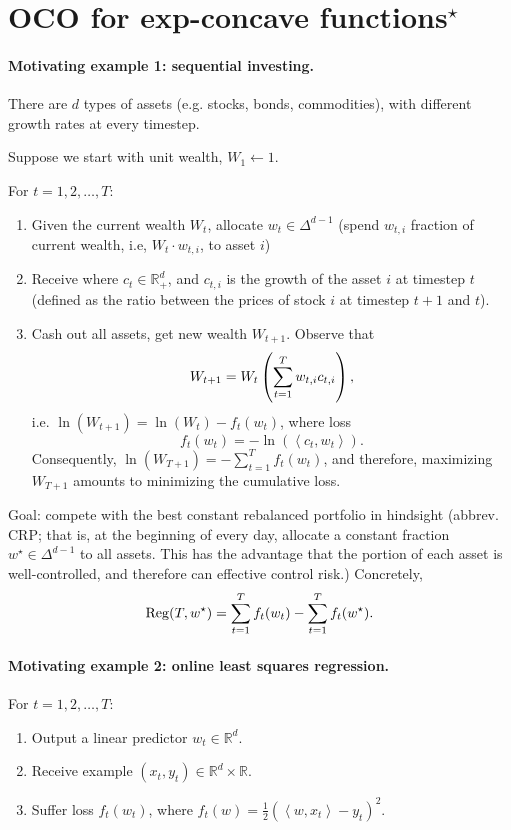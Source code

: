 \documentclass{article}
\DeclareMathOperator*{\Reg}{{\rm Reg}}
\newcommand{\RR}{\mathbb{R}} %
\newcommand{\inner}[2]{\left\langle #1,#2 \right\rangle}
\begin{document}

\section{OCO for exp-concave functions$^\star$}

\paragraph{Motivating example 1: sequential investing.} There are $d$ types of assets (e.g. stocks, bonds, commodities), with different growth rates at every timestep.

Suppose we start with unit wealth, $W_1 \gets 1$.

For $t = 1,2,\ldots,T$:
\begin{enumerate}
\item Given the current wealth $W_t$, allocate $w_t \in \Delta^{d-1}$ (spend $w_{t,i}$ fraction of current wealth, i.e, $W_t \cdot w_{t,i}$, to asset $i$)
\item Receive where $c_t \in \RR^d_+$, and $c_{t,i}$ is the growth of the asset $i$ at timestep $t$ (defined as the ratio between the prices of stock $i$ at timestep $t+1$ and $t$).
\item Cash out all assets, get new wealth $W_{t+1}$. Observe that
\[ W_{t+1} = W_t \del{\sum_{t=1}^T w_{t,i} c_{t,i}}, \]
i.e. $\ln(W_{t+1}) = \ln(W_t) - f_t(w_t)$, where loss
\[ f_t(w_t) = -\ln(\inner{c_t}{w_t}).\]
Consequently, $\ln(W_{T+1}) = -\sum_{t=1}^T f_t(w_t)$, and therefore, maximizing $W_{T+1}$ amounts to minimizing the cumulative loss.
\end{enumerate}

Goal: compete with the best constant rebalanced portfolio in hindsight (abbrev. CRP; that is, at the beginning of every day, allocate a constant fraction $w^\star \in \Delta^{d-1}$ to all assets. This has the advantage that the portion of each asset is well-controlled, and therefore can effective control risk.)
Concretely,
\[ \Reg(T, w^\star) = \sum_{t=1}^T f_t(w_t) - \sum_{t=1}^T f_t(w^\star). \]


\paragraph{Motivating example 2: online least squares regression.}

For $t = 1,2,\ldots,T$:
\begin{enumerate}
\item Output a linear predictor $w_t \in \RR^d$.
\item Receive example $(x_t, y_t) \in \RR^d \times \RR$.
\item Suffer loss $f_t(w_t)$, where $f_t(w) = \frac12(\inner{w}{x_t} - y_t)^2$.
\end{enumerate}
\end{document}

